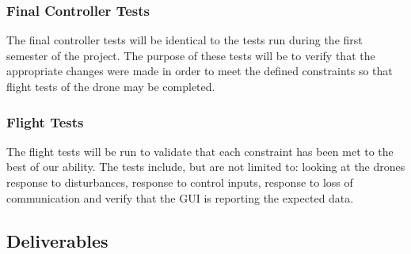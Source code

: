 \subsubsection{Final Controller Tests}
The final controller tests will be identical to the tests run during the first semester of the project. The purpose of these tests will be to verify that the appropriate changes were made in order to meet the defined constraints so that flight tests of the drone may be completed. 

\subsubsection{Flight Tests}
The flight tests will be run to validate that each constraint has been met to the best of our ability. The tests include, but are not limited to: looking at the drones response to disturbances, response to control inputs, response to loss of communication and verify that the GUI is reporting the expected data. 

\subsection{Deliverables}



	
